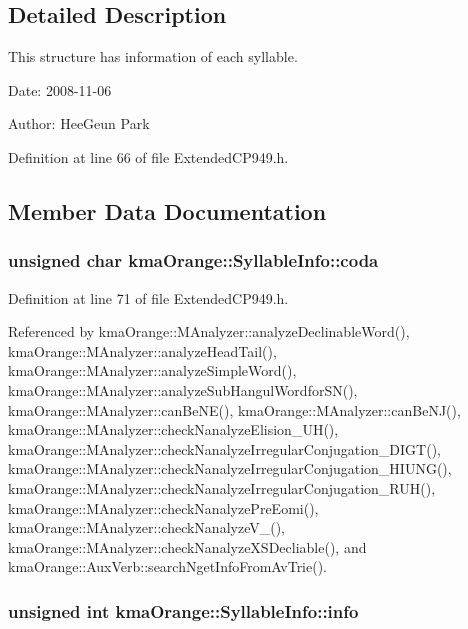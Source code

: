 \subsection{Detailed Description}
This structure has information of each syllable. 

\begin{Desc}
\item[Date:]2008-11-06 \end{Desc}
\begin{Desc}
\item[Author:]HeeGeun Park \end{Desc}


Definition at line 66 of file ExtendedCP949.h.

\subsection{Member Data Documentation}
\hypertarget{structkmaOrange_1_1SyllableInfo_a6a8c8ba7cd384ca890d13a29a3237cb}{
\subsubsection[{coda}]{\setlength{\rightskip}{0pt plus 5cm}unsigned char {\bf kmaOrange::SyllableInfo::coda}}}
\label{structkmaOrange_1_1SyllableInfo_a6a8c8ba7cd384ca890d13a29a3237cb}




Definition at line 71 of file ExtendedCP949.h.

Referenced by kmaOrange::MAnalyzer::analyzeDeclinableWord(), kmaOrange::MAnalyzer::analyzeHeadTail(), kmaOrange::MAnalyzer::analyzeSimpleWord(), kmaOrange::MAnalyzer::analyzeSubHangulWordforSN(), kmaOrange::MAnalyzer::canBeNE(), kmaOrange::MAnalyzer::canBeNJ(), kmaOrange::MAnalyzer::checkNanalyzeElision\_\-UH(), kmaOrange::MAnalyzer::checkNanalyzeIrregularConjugation\_\-DIGT(), kmaOrange::MAnalyzer::checkNanalyzeIrregularConjugation\_\-HIUNG(), kmaOrange::MAnalyzer::checkNanalyzeIrregularConjugation\_\-RUH(), kmaOrange::MAnalyzer::checkNanalyzePreEomi(), kmaOrange::MAnalyzer::checkNanalyzeV\_\-(), kmaOrange::MAnalyzer::checkNanalyzeXSDecliable(), and kmaOrange::AuxVerb::searchNgetInfoFromAvTrie().\hypertarget{structkmaOrange_1_1SyllableInfo_f59a8e2891f6b3a66d6c55bf8cfa92d0}{
\subsubsection[{info}]{\setlength{\rightskip}{0pt plus 5cm}unsigned int {\bf kmaOrange::SyllableInfo::info}}}
\label{structkmaOrange_1_1SyllableInfo_f59a8e2891f6b3a66d6c55bf8cfa92d0}




